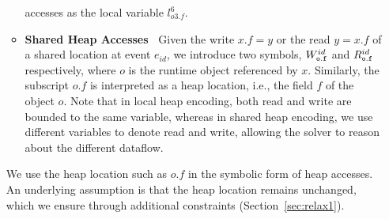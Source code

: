 \begin{itemize}
\begin{itemize}
accesses as the local variable $l^6_{o3.f}$.
\item  {\bf Shared Heap Accesses\ }  Given the write $x.f=y$ or the read $y=x.f$ of a shared location at event $e_{id}$, we introduce two symbols, $W^{id}_{\tt o.f }$ and $R^{id}_{\tt  o.f }$ respectively, where $o$ is the runtime object referenced by $x$. Similarly, the subscript $o.f$ is interpreted as a heap location, i.e., the field $f$ of the object $o$. Note that in local heap encoding, 
both read and write are bounded to the same variable, whereas in shared
heap encoding, we use different variables to denote read and write, allowing
the solver to reason about the different dataflow.
\end{itemize}
We use the heap location such as $o.f$ in the symbolic form of heap accesses.
 An underlying assumption is that the heap location remains unchanged, 
which we ensure through additional constraints (Section~\ref{sec:relax1}).
\end{itemize}





%



